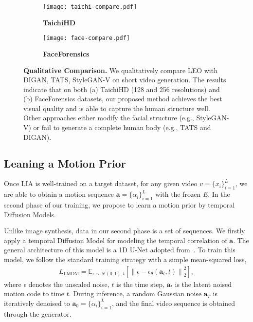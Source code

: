 \begin{figure*}[t!]
\centering
\begin{subfigure}[t]{1.0\textwidth}
\centering
\texttt{[image: taichi-compare.pdf]}
\caption{\footnotesize{\textbf{TaichiHD}}}
\end{subfigure}
\begin{subfigure}[t]{1.0\textwidth}
\centering
\texttt{[image: face-compare.pdf]}
\caption{\footnotesize{\textbf{FaceForensics}}}
\end{subfigure}
\caption{\textbf{Qualitative Comparison.} We qualitatively compare LEO with DIGAN, TATS, StyleGAN-V on short video generation. The results indicate that on both (a) TaichiHD (128 and 256 resolutions) and (b) FaceForensics datasets, our proposed method achieves the best visual quality and is able to capture the human structure well. Other approaches either modify the facial structure (e.g., StyleGAN-V) or fail to generate a complete human body (e.g., TATS and DIGAN).}
\label{fig:qualitative}
\end{figure*} 

\subsection{Leaning a Motion Prior}
Once LIA is well-trained on a target dataset, for any given video $v=\{x_i\}^{L}_{i=1}$, we are able to obtain a motion sequence $\mathbf{a}=\{\alpha_i\}^{L}_{i=1}$ with the frozen $E$. In the second phase of our training, we propose to learn a motion prior by temporal Diffusion Models. 

Unlike image synthesis, data in our second phase is a set of sequences. We firstly apply a temporal Diffusion Model for modeling the temporal correlation of $\mathbf{a}$. The general architecture of this model is a 1D U-Net adopted from~\cite{ddpm}. To train this model, we follow the standard training strategy with a simple mean-squared loss,
\begin{align}
    L_{\text{LMDM}} = \mathbb{E}_{\epsilon \sim \mathcal{N} (0,1), t}\left [ \left \| \epsilon - \epsilon_{\theta}(\mathbf{a}_t, t)\right \|^{2}_{2}\right],  
\end{align}
where $\epsilon$ denotes the unscaled noise, $t$ is the time step, $\mathbf{a}_t$ is the latent noised motion code to time $t$. During inference, a random Gaussian noise $\mathbf{a}_T$ is iteratively denoised to $\mathbf{a}_0=\{\alpha_i\}^{L}_{i=1}$, and the final video sequence is obtained through the generator. %

